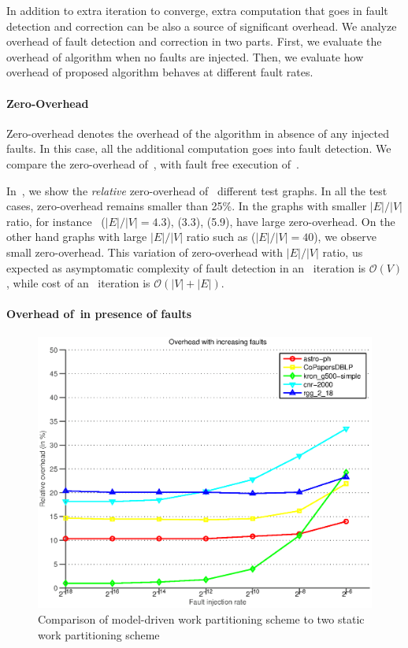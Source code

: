 In addition to extra iteration to converge, extra computation that goes in 
fault detection  and correction can be also a source of significant overhead. 
We analyze overhead of fault detection and correction in two parts.
 First, we evaluate the overhead of algorithm \ftsv when no faults are injected.
  Then, we evaluate how overhead of proposed algorithm behaves at different fault rates. 

\paragraph{Zero-Overhead} Zero-overhead denotes the overhead of the algorithm 
in absence of any injected faults. In this case, all the additional computation
 goes into fault detection. We compare the zero-overhead of~, with 
 fault free execution of~. 

 In~, we show the \emph{relative} zero-overhead of~ 
 different test graphs. In all the test cases, zero-overhead remains smaller than 25\%. 
 In the graphs with smaller $|E|/|V|$ ratio, for instance~ ($|E|/|V|=4.3$),
  (3.3),  (5.9), have large zero-overhead. On the other hand graphs with large $|E|/|V|$ ratio such as  ($|E|/|V|=40$), we observe small zero-overhead. This variation of zero-overhead with $|E|/|V|$ ratio, us expected as asymptomatic complexity of fault detection in an ~\ftsv iteration is $\mathcal{O}(V)$, while cost of an ~\sv iteration is $\mathcal{O}(|V|+|E|)$.  

\paragraph{Overhead of~\ftsv in presence of faults}

\begin{figure}[ht]
\includegraphics[width=.5\textwidth]{plots/plot_overhead_fault.eps}
\caption{\label{fig:oh-plot} 
\small Comparison of model-driven work partitioning scheme to
two static work partitioning scheme}
\end{figure}

